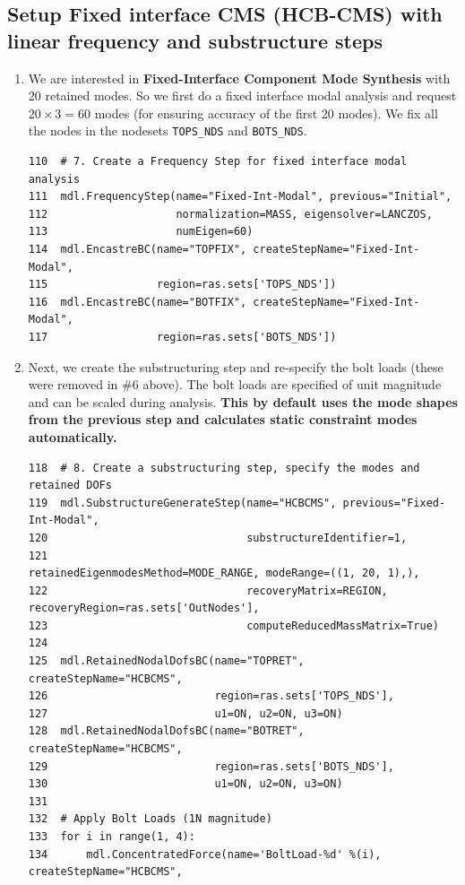 \documentclass[11pt]{article}
\begin{document}
\subsection{Setup Fixed interface CMS (HCB-CMS) with linear frequency and substructure steps}
\label{sec:orgaece6c1}
\begin{enumerate}
\item We are interested in \textbf{Fixed-Interface Component Mode Synthesis} with 20 retained modes.
So we first do a fixed interface modal analysis and request \(20\times3 = 60\) modes (for ensuring accuracy of the first 20 modes).
We fix all the nodes in the nodesets \texttt{TOPS\_NDS} and \texttt{BOTS\_NDS}.
\begin{verbatim}
110  # 7. Create a Frequency Step for fixed interface modal analysis
111  mdl.FrequencyStep(name="Fixed-Int-Modal", previous="Initial",
112                    normalization=MASS, eigensolver=LANCZOS,
113                    numEigen=60)
114  mdl.EncastreBC(name="TOPFIX", createStepName="Fixed-Int-Modal",
115                 region=ras.sets['TOPS_NDS'])
116  mdl.EncastreBC(name="BOTFIX", createStepName="Fixed-Int-Modal",
117                 region=ras.sets['BOTS_NDS'])
\end{verbatim}
\item Next, we create the substructuring step and re-specify the bolt loads (these were removed in \#6 above).
The bolt loads are specified of unit magnitude and can be scaled during analysis.
\textbf{This by default uses the mode shapes from the previous step and calculates static constraint modes automatically.}
\begin{verbatim}
118  # 8. Create a substructuring step, specify the modes and retained DOFs
119  mdl.SubstructureGenerateStep(name="HCBCMS", previous="Fixed-Int-Modal",
120                               substructureIdentifier=1, 
121                               retainedEigenmodesMethod=MODE_RANGE, modeRange=((1, 20, 1),),
122                               recoveryMatrix=REGION, recoveryRegion=ras.sets['OutNodes'],
123                               computeReducedMassMatrix=True)
124  
125  mdl.RetainedNodalDofsBC(name="TOPRET", createStepName="HCBCMS", 
126                          region=ras.sets['TOPS_NDS'], 
127                          u1=ON, u2=ON, u3=ON)
128  mdl.RetainedNodalDofsBC(name="BOTRET", createStepName="HCBCMS", 
129                          region=ras.sets['BOTS_NDS'], 
130                          u1=ON, u2=ON, u3=ON)
131  
132  # Apply Bolt Loads (1N magnitude)
133  for i in range(1, 4):
134      mdl.ConcentratedForce(name='BoltLoad-%d' %(i), createStepName="HCBCMS",

\end{verbatim}
\end{enumerate}
\end{document}
